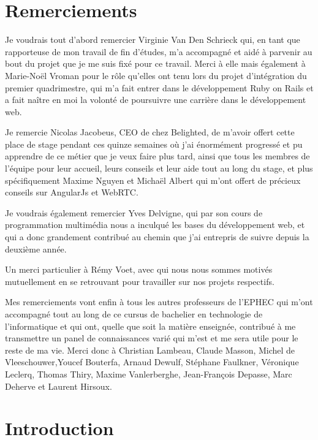 \documentclass{report}
\begin{document}
\newpage
\thispagestyle{empty}
\mbox{}

\tableofcontents
\clearpage


\chapter*{Remerciements}

  Je voudrais tout d'abord remercier Virginie Van Den Schrieck qui, en tant que rapporteuse de mon travail de fin d'études,
  m'a accompagné et aidé à parvenir au bout du projet que je me suis fixé pour ce travail.
  Merci à elle mais également à Marie-Noël Vroman pour le rôle qu'elles ont tenu lors du projet d'intégration du premier quadrimestre,
  qui m'a fait entrer dans le développement Ruby on Rails et a fait naître en moi la volonté de poursuivre une carrière dans le développement web.

  Je remercie Nicolas Jacobeus, CEO de chez Belighted, de m'avoir offert cette place de stage pendant ces quinze
  semaines où j'ai énormément progressé et pu apprendre de ce métier que je veux faire plus tard, ainsi que tous les membres
  de l'équipe pour leur accueil, leurs conseils et leur aide tout au long du stage, et plus spécifiquement Maxime Nguyen et Michaël Albert qui m'ont
  offert de précieux conseils sur AngularJs et WebRTC.

  Je voudrais également remercier Yves Delvigne, qui par son cours de programmation multimédia
  nous a inculqué les bases du développement web, et qui a donc grandement contribué
  au chemin que j'ai entrepris de suivre depuis la deuxième année.

  Un merci particulier à Rémy Voet, avec qui nous nous sommes motivés mutuellement en se retrouvant pour
  travailler sur nos projets respectifs.

  Mes remerciements vont enfin à tous les autres professeurs de l'EPHEC qui m'ont accompagné tout au long
  de ce cursus de bachelier en technologie de l'informatique et qui ont, quelle que soit la matière
  enseignée, contribué à me transmettre un panel de connaissances varié qui m'est et me sera utile pour
  le reste de ma vie. Merci donc à Christian Lambeau, Claude Masson, Michel de Vleeschouwer,Youcef Bouterfa, Arnaud Dewulf,
  Stéphane Faulkner, Véronique Leclerq, Thomas Thiry, Maxime Vanlerberghe, Jean-François Depasse, Marc Deherve et Laurent Hirsoux.


\chapter{Introduction}
\end{document}
